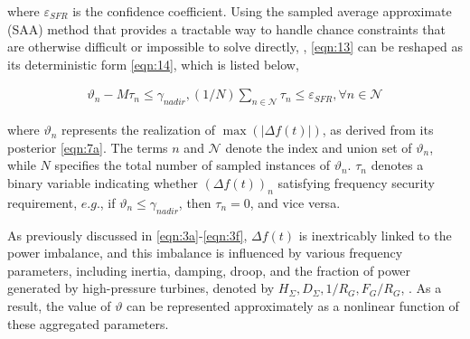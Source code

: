 \documentclass[lettersize,journal]{IEEEtran}
\begin{document}
\noindent where $\varepsilon_{SFR}$ is the confidence coefficient. Using the sampled average approximate (SAA) method that provides a tractable way to handle chance constraints that are otherwise difficult or impossible to solve directly, \cite{yan2021chance}, \eqref{eqn:13} can be reshaped as its deterministic form \eqref{eqn:14}, which is listed below,

\vspace{-0.125in}
	\begin{small} \begin{align}
		\vartheta_{n} - M\tau_{n}\! \leq \!\gamma_{nadir}, (1/{N})\sum\nolimits_{n\in\mathcal{N}}  \tau_{n} \leq \varepsilon_{SFR},\forall n \in \mathcal{N} \label{eqn:14}
	\end{align}
\end{small}

\vspace{-0.025in}
\noindent where \(\vartheta_{n}\) represents the realization of \(\max ( |\varDelta f(t)| )\), as derived from its posterior \eqref{eqn:7a}. The terms $n$ and $\mathcal{N}$ denote the index and union set of \(\vartheta_{n}\), while $N$ specifies the total number of sampled instances of \(\vartheta_{n}\). \(\tau_{n}\) denotes a binary variable indicating whether \((\varDelta f(t))_{n}\) satisfying frequency security requirement, $e.g.$, if \(\vartheta_{n}\!\leq\! \gamma_{nadir}\), then \(\tau_{n}\!=\!0\), and vice versa.



As previously discussed in \eqref{eqn:3a}-\eqref{eqn:3f}, \(\varDelta f(t)\) is inextricably linked to the power imbalance, and this imbalance is influenced by various frequency parameters, including inertia, damping, droop, and the fraction of power generated by high-pressure turbines, denoted by \(H_{\varSigma}, D_{\varSigma}, 1/R_{G}, F_{G}/R_{G} \), \cite{paturet2020stochastic,zhang2020modeling,9765359}. As a result, the value of $\vartheta$ can be represented approximately as a nonlinear function of these aggregated parameters.
\end{document}
